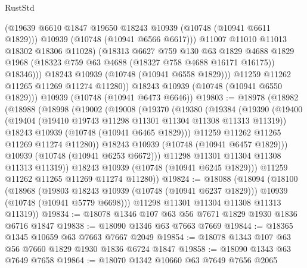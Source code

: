 \begin{lexlean}{RustStd}
\begin{coremodule}
{\begin{coremodule}
{{{{{                    (@19639 @6610 @1847 @19650 @18243 @10939 (@10748 (@10941 @6611 @1829)))
                    @10939
                    (@10748 (@10941 @6566 @6617)))
                  @11007
                  @11010
                  @11013
                  @18302
                  @18306
                  @11028)
                (@18313
                  @6627
                  @759
                  @130
                  @63
                  @1829
                  @4688
                  @1829
                  @1968
                  (@18323 @759 @63 @4688 (@18327 @758 @4688 @16171 @16175))
                  @18346)))
            @18243
            @10939
            (@10748 (@10941 @6558 @1829)))
          @11259
          @11262
          @11265
          @11269
          @11274
          @11280))
      @18243
      @10939
      (@10748 (@10941 @6550 @1829)))
    @10939
    (@10748 (@10941 @6473 @6646))
@19803 := @18978
    (@18982
      (@18988
        (@18998
          (@19002
            (@19008
              (@19370
                (@19380
                  (@19384
                    (@19390
                      (@19400
                        (@19404 (@19410 @19743 @11298 @11301 @11304 @11308 @11313 @11319))
                        @18243
                        @10939
                        (@10748 (@10941 @6465 @1829)))
                      @11259
                      @11262
                      @11265
                      @11269
                      @11274
                      @11280))
                  @18243
                  @10939
                  (@10748 (@10941 @6457 @1829)))
                @10939
                (@10748 (@10941 @6253 @6672)))
              @11298
              @11301
              @11304
              @11308
              @11313
              @11319))
          @18243
          @10939
          (@10748 (@10941 @6245 @1829)))
        @11259
        @11262
        @11265
        @11269
        @11274
        @11280))
@19824 := @18088
    (@18094
      (@18100
        (@18968
          (@19803 @18243 @10939 (@10748 (@10941 @6237 @1829)))
          @10939
          (@10748 (@10941 @5779 @6698)))
        @11298
        @11301
        @11304
        @11308
        @11313
        @11319))
@19834 := @18078 @1346 @107 @63 @56 @7671 @1829 @1930 @1836 @6716 @1847
@19838 := @18090 @1346 @63 @7663 @7669
@19844 := @18365 @1345 @10659 @63 @7663 @7667 @2049
@19854 := @18078 @1343 @107 @63 @56 @7660 @1829 @1930 @1836 @6724 @1847
@19858 := @18090 @1343 @63 @7649 @7658
@19864 := @18070 @1342 @10660 @63 @7649 @7656 @2065
}}}}}
\end{coremodule}}
\end{coremodule}
\end{lexlean}
